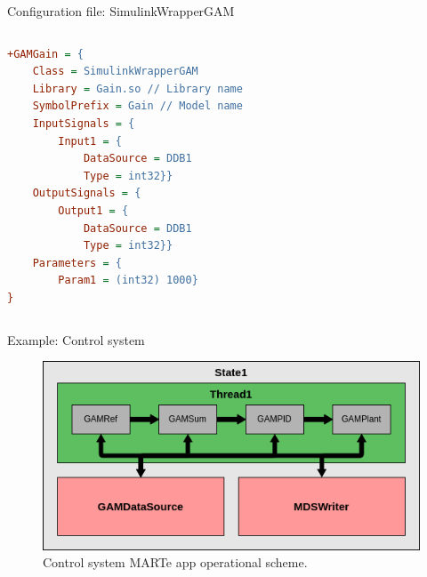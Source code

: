 \begin{frame}[fragile]{Configuration file: SimulinkWrapperGAM}
	\begin{columns}
		\begin{lstlisting}[style=small, language = cfg, caption=SimulinkWrapperGAM configuration structure (brackets due to space constraints).]
+GAMGain = {
    Class = SimulinkWrapperGAM
    Library = Gain.so // Library name
    SymbolPrefix = Gain // Model name
    InputSignals = {
        Input1 = {
            DataSource = DDB1
            Type = int32}}
    OutputSignals = {
        Output1 = {
            DataSource = DDB1
            Type = int32}}
    Parameters = {
        Param1 = (int32) 1000}
}\end{lstlisting}
	\end{columns}
\end{frame}

\begin{frame}{Example: Control system}
	\begin{figure}
		\centering
		\includegraphics[scale=.67]{ControlSystem.png}
		\caption{Control system MARTe app operational scheme.}
		\label{fig:control}
	\end{figure}
\end{frame}
